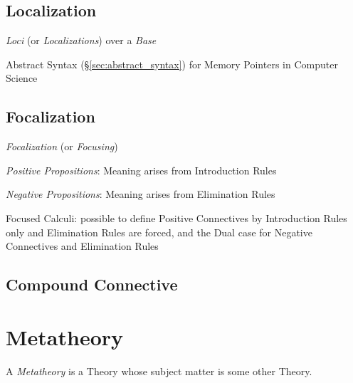 \subsection{Localization}\label{sec:localization}

\emph{Loci} (or \emph{Localizations}) over a \emph{Base}

Abstract Syntax (\S\ref{sec:abstract_syntax}) for Memory Pointers in
Computer Science



\subsection{Focalization}\label{sec:focalization}

\emph{Focalization} (or \emph{Focusing})

\emph{Positive Propositions}: Meaning arises from Introduction Rules

\emph{Negative Propositions}: Meaning arises from Elimination Rules

Focused Calculi: possible to define Positive Connectives by
Introduction Rules only and Elimination Rules are forced, and the Dual
case for Negative Connectives and Elimination Rules



\subsection{Compound Connective}\label{sec:compound_connective}



\section{Metatheory} \label{sec:metatheory}

A \emph{Metatheory} is a Theory whose subject matter is some other
Theory.



